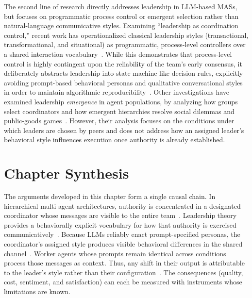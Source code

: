 The second line of research directly addresses leadership in \ac{LLM}-based \acp{MAS}, but focuses on programmatic process control or emergent selection rather than natural-language communicative styles.
Examining ``leadership as coordination control,'' recent work has operationalized classical leadership styles (transactional, transformational, and situational) as programmatic, process-level controllers over a shared interaction vocabulary~\cite{kwak2026leadershipcoordinationcontrolbehavioral}.
While this demonstrates that process-level control is highly contingent upon the reliability of the team's early consensus, it deliberately abstracts leadership into state-machine-like decision rules, explicitly avoiding prompt-based behavioral personas and qualitative conversational styles in order to maintain algorithmic reproducibility~\cite{kwak2026leadershipcoordinationcontrolbehavioral}.
Other investigations have examined leadership \textit{emergence} in agent populations, by analyzing how groups select coordinators and how emergent hierarchies resolve social dilemmas and public-goods games~\cite{faulkner2026evaluatingcooperationllmsocial}.
However, their analysis focuses on the conditions under which leaders are chosen by peers and does not address how an assigned leader's behavioral style influences execution once authority is already established.

\section{Chapter Synthesis}
\label{sec:chapter-synthesis}

The arguments developed in this chapter form a single causal chain.
In hierarchical multi-agent architectures, authority is concentrated in a designated coordinator whose messages are visible to the entire team~\cite{wang2025talkstructurallyacthierarchically, chen2023agentversefacilitatingmultiagentcollaboration}.
Leadership theory provides a behaviorally explicit vocabulary for how that authority is exercised communicatively~\cite{goleman2000leadership}.
Because \acp{LLM} reliably enact prompt-specified personas, the coordinator's assigned style produces visible behavioral differences in the shared channel~\cite{shanahan2023roleplaylargelanguagemodels, serapiogarcia2025personalitytraitslargelanguage, jiang2024personallminvestigatingabilitylarge}.
Worker agents whose prompts remain identical across conditions process those messages as context.
Thus, any shift in their output is attributable to the leader's style rather than their configuration~\cite{shanahan2023roleplaylargelanguagemodels, lin2025simulatingsocialinfluencedynamics}.
The consequences (quality, cost, sentiment, and satisfaction) can each be measured with instruments whose limitations are known.

